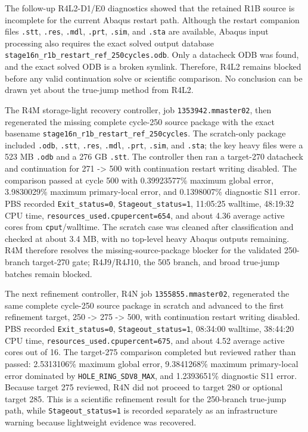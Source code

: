 \documentclass{article}
\begin{document}
The follow-up R4L2-D1/E0 diagnostics showed that the retained R1B source is incomplete for the current Abaqus restart path. Although the restart companion files \texttt{.stt}, \texttt{.res}, \texttt{.mdl}, \texttt{.prt}, \texttt{.sim}, and \texttt{.sta} are available, Abaqus input processing also requires the exact solved output database \texttt{stage16n\_r1b\_restart\_ref\_250cycles.odb}. Only a datacheck ODB was found, and the exact solved ODB is a broken symlink. Therefore, R4L2 remains blocked before any valid continuation solve or scientific comparison. No conclusion can be drawn yet about the true-jump method from R4L2.

The R4M storage-light recovery controller, job \texttt{1353942.mmaster02}, then regenerated the missing complete cycle-250 source package with the exact basename \texttt{stage16n\_r1b\_restart\_ref\_250cycles}. The scratch-only package included \texttt{.odb}, \texttt{.stt}, \texttt{.res}, \texttt{.mdl}, \texttt{.prt}, \texttt{.sim}, and \texttt{.sta}; the key heavy files were a 523 MB \texttt{.odb} and a 276 GB \texttt{.stt}. The controller then ran a target-270 datacheck and continuation for 271 -> 500 with continuation restart writing disabled. The comparison passed at cycle 500 with 0.39923577\% maximum global error, 3.9830029\% maximum primary-local error, and 0.1398007\% diagnostic S11 error. PBS recorded \texttt{Exit\_status=0}, \texttt{Stageout\_status=1}, 11:05:25 walltime, 48:19:32 CPU time, \texttt{resources\_used.cpupercent=654}, and about 4.36 average active cores from \texttt{cput}/walltime. The scratch case was cleaned after classification and checked at about 3.4 MB, with no top-level heavy Abaqus outputs remaining. R4M therefore resolves the missing-source-package blocker for the validated 250-branch target-270 gate; R4J9/R4J10, the 505 branch, and broad true-jump batches remain blocked.

The next refinement controller, R4N job \texttt{1355855.mmaster02}, regenerated the same complete cycle-250 source package in scratch and advanced to the first refinement target, 250 -> 275 -> 500, with continuation restart writing disabled. PBS recorded \texttt{Exit\_status=0}, \texttt{Stageout\_status=1}, 08:34:00 walltime, 38:44:20 CPU time, \texttt{resources\_used.cpupercent=675}, and about 4.52 average active cores out of 16. The target-275 comparison completed but reviewed rather than passed: 2.5313106\% maximum global error, 9.3841268\% maximum primary-local error dominated by \texttt{HOLE\_RING\_SDV8\_MAX}, and 1.2393651\% diagnostic S11 error. Because target 275 reviewed, R4N did not proceed to target 280 or optional target 285. This is a scientific refinement result for the 250-branch true-jump path, while \texttt{Stageout\_status=1} is recorded separately as an infrastructure warning because lightweight evidence was recovered.
\end{document}

